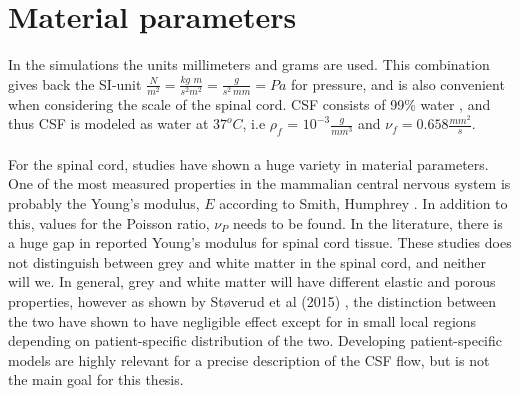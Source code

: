 \chapter{Material parameters}
In the simulations the units millimeters and grams are used. This combination gives back the SI-unit $\frac{N}{m^2} = \frac{kg\,\,m}{s^2 m^2} = \frac{g}{s^2\,mm} = Pa$ for pressure, and is also convenient when considering the scale of the spinal cord. CSF consists of 99\% water \cite{Fish92}, and thus CSF is modeled as water at $37^o C$, i.e $\rho_f$ = $10^{-3} \frac{g}{mm^3}$ and $\nu_f = 0.658 \frac{mm^2}{s}$.
\\
\\
For the spinal cord, studies have shown a huge variety in material parameters. One of the most measured properties in the mammalian central nervous system is probably the Young's modulus, $E$ according to Smith, Humphrey \cite{Smit07}. In addition to this, values for the Poisson ratio, $\nu_P$ needs to be found. In the literature, there is a huge gap in reported Young's modulus for spinal cord tissue. These studies does not distinguish between grey and white matter in the spinal cord, and neither will we. In general, grey and white matter will have different elastic and porous properties, however as shown by St{\o}verud et al (2015) \cite{Stov15}, the distinction between the two have shown to have negligible effect except for in small local regions depending on patient-specific distribution of the two. Developing patient-specific models are highly relevant for a precise description of the CSF flow, but is not the main goal for this thesis. 


